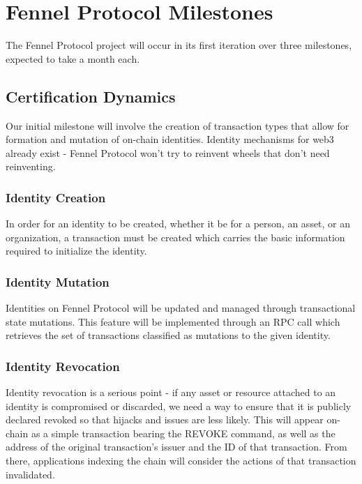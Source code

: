 \documentclass[]{article}
\begin{document}
\section{Fennel Protocol Milestones}
\label{scrivauto:43}

The Fennel Protocol project will occur in its first iteration over three milestones, expected to take a month each.

\subsection{Certification Dynamics}
\label{scrivauto:44}

Our initial milestone will involve the creation of transaction types that allow for formation and mutation of on-chain identities. Identity mechanisms for web3 already exist - Fennel Protocol won't try to reinvent wheels that don't need reinventing. 

\subsubsection{Identity Creation}
\label{scrivauto:45}

In order for an identity to be created, whether it be for a person, an asset, or an organization, a transaction must be created which carries the basic information required to initialize the identity.

\subsubsection{Identity Mutation}
\label{scrivauto:46}

Identities on Fennel Protocol will be updated and managed through transactional state mutations. This feature will be implemented through an RPC call which retrieves the set of transactions classified as mutations to the given identity. 

\subsubsection{Identity Revocation}
\label{scrivauto:47}

Identity revocation is a serious point - if any asset or resource attached to an identity is compromised or discarded, we need a way to ensure that it is publicly declared revoked so that hijacks and issues are less likely. This will appear on-chain as a simple transaction bearing the REVOKE command, as well as the address of the original transaction's issuer and the ID of that transaction. From there, applications indexing the chain will consider the actions of that transaction invalidated.
\end{document}
